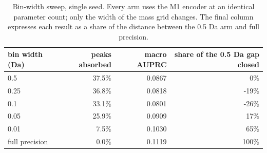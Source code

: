 \begin{table}[htbp]
\centering
\caption{Bin-width sweep, single seed. Every arm uses the M1 encoder at an identical parameter count; only the width of the mass grid changes. The final column expresses each result as a share of the distance between the 0.5 Da arm and full precision.}
\label{tab:table3_binwidth}
\begin{tabular}{l r r r}
\toprule
bin width (Da) & peaks absorbed & macro AUPRC & share of the 0.5 Da gap closed \\
\midrule
0.5 & 37.5\% & 0.0867 & 0\% \\
0.25 & 36.8\% & 0.0818 & -19\% \\
0.1 & 33.1\% & 0.0801 & -26\% \\
0.05 & 25.9\% & 0.0909 & 17\% \\
0.01 & 7.5\% & 0.1030 & 65\% \\
full precision & 0.0\% & 0.1119 & 100\% \\
\bottomrule
\end{tabular}
\end{table}
